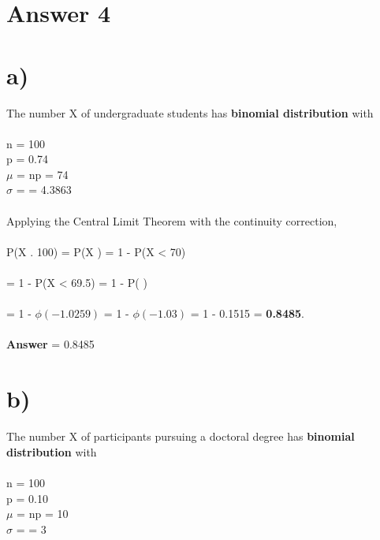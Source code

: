 \documentclass[11pt]{article}
\begin{document}
\newpage
\section*{Answer 4}
\section*{a)}

The number X of undergraduate students has \textbf{binomial distribution} with \\ \\

\indent n = 100 \\
\indent p = 0.74 \\
\indent $\mu$ = np = 74 \\
\indent $\sigma$ =  = 4.3863 \\ \\

\noindent Applying the Central Limit Theorem with the continuity correction, \\ \\

P(X \geq {} . 100) = P(X ) = 1 - P(X < 70) \\ \\
\indent = 1 - P(X < 69.5) = 1 - P( \leq {}) \\ \\
\indent = 1 - $\phi(-1.0259)$ = 1 - $\phi(-1.03)$ = 1 - 0.1515 = \textbf{0.8485}. \\ \\

\noindent \textbf{Answer} = 0.8485 \\

\section*{b)}

The number X of participants pursuing a doctoral degree has \textbf{binomial distribution} with \\ \\

\indent n = 100 \\
\indent p = 0.10 \\
\indent $\mu$ = np = 10 \\
\indent $\sigma$ =  = 3 \\ \\
\end{document}
